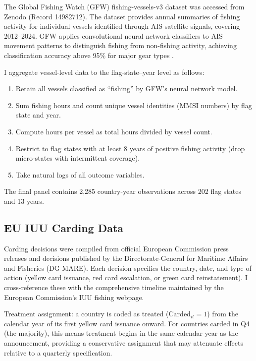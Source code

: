 \documentclass[12pt]{article}
\begin{document}
The Global Fishing Watch (GFW) fishing-vessels-v3 dataset was accessed from Zenodo (Record 14982712). The dataset provides annual summaries of fishing activity for individual vessels identified through AIS satellite signals, covering 2012--2024. GFW applies convolutional neural network classifiers to AIS movement patterns to distinguish fishing from non-fishing activity, achieving classification accuracy above 95\% for major gear types \citep{kroodsma2018tracking}.

I aggregate vessel-level data to the flag-state--year level as follows:
\begin{enumerate}
\item Retain all vessels classified as ``fishing'' by GFW's neural network model.
\item Sum fishing hours and count unique vessel identities (MMSI numbers) by flag state and year.
\item Compute hours per vessel as total hours divided by vessel count.
\item Restrict to flag states with at least 8 years of positive fishing activity (drop micro-states with intermittent coverage).
\item Take natural logs of all outcome variables.
\end{enumerate}

The final panel contains 2,285 country-year observations across 202 flag states and 13 years.

\subsection{EU IUU Carding Data}

Carding decisions were compiled from official European Commission press releases and decisions published by the Directorate-General for Maritime Affairs and Fisheries (DG MARE). Each decision specifies the country, date, and type of action (yellow card issuance, red card escalation, or green card reinstatement). I cross-reference these with the comprehensive timeline maintained by the European Commission's IUU fishing webpage.

Treatment assignment: a country is coded as treated ($\text{Carded}_{it} = 1$) from the calendar year of its first yellow card issuance onward. For countries carded in Q4 (the majority), this means treatment begins in the same calendar year as the announcement, providing a conservative assignment that may attenuate effects relative to a quarterly specification.
\end{document}
